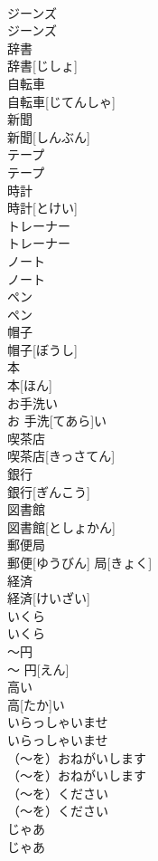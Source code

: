 \documentclass[8pt]{extreport}
\begin{document}
\begin{CJK}{UTF8}{min}
\\	ジーンズ	
\\	ジーンズ
\\	辞書	
\\	辞書[じしょ]
\\	自転車	
\\	自転車[じてんしゃ]
\\	新聞	
\\	新聞[しんぶん]
\\	テープ	
\\	テープ
\\	時計	
\\	時計[とけい]
\\	トレーナー	
\\	トレーナー
\\	ノート	
\\	ノート
\\	ペン	
\\	ペン
\\	帽子	
\\	帽子[ぼうし]
\\	本	
\\	本[ほん]
\\	お手洗い	
\\	お 手洗[てあら]い
\\	喫茶店	
\\	喫茶店[きっさてん]
\\	銀行	
\\	銀行[ぎんこう]
\\	図書館	
\\	図書館[としょかん]
\\	郵便局	
\\	郵便[ゆうびん] 局[きょく]
\\	経済	
\\	経済[けいざい]
\\	いくら	
\\	いくら
\\	〜円	
\\	〜 円[えん]
\\	高い	
\\	高[たか]い
\\	いらっしゃいませ	
\\	いらっしゃいませ
\\	（〜を）おねがいします	
\\	（〜を）おねがいします
\\	（〜を）ください	
\\	（〜を）ください
\\	じゃあ	
\\	じゃあ

\end{CJK}
\end{document}
